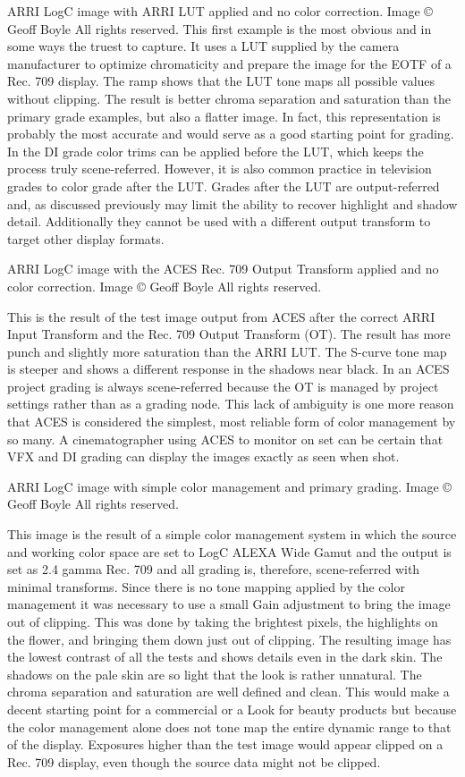 ARRI LogC image with ARRI LUT applied and no color correction.  Image © Geoff Boyle All rights reserved.
This first example is the most obvious and in some ways the truest to capture. It uses a LUT supplied by the camera manufacturer to optimize chromaticity and prepare the image for the EOTF of a Rec. 709 display. The ramp shows that the LUT tone maps all possible values without clipping. The result is better chroma separation and saturation than the primary grade examples, but also a flatter image. In fact, this representation is probably the most accurate and would serve as a good starting point for grading. In the DI grade color trims can be applied before the LUT, which keeps the process truly scene-referred. However, it is also common practice in television grades to color grade after the LUT. Grades after the LUT are output-referred and, as discussed previously may limit the ability to recover highlight and shadow detail. Additionally they cannot be used with a different output transform to target other display formats. 


ARRI LogC image with the ACES Rec. 709 Output Transform applied and no color correction.  Image © Geoff Boyle All rights reserved.


This is the result of the test image output from ACES after the correct ARRI Input Transform and the Rec. 709 Output Transform (OT). The result has more punch and slightly more saturation than the ARRI LUT. The S-curve tone map is steeper and shows a different response in the shadows near black. In an ACES project grading is always scene-referred because the OT is managed by project settings rather than as a grading node. This lack of ambiguity is one more reason that ACES is considered the simplest, most reliable form of color management by so many. A cinematographer using ACES to monitor on set can be certain that VFX and DI grading can display the images exactly as seen when shot.


ARRI LogC image with simple color management and primary grading.  Image © Geoff Boyle All rights reserved.

This image is the result of a simple color management system in which the source and working color space are set to LogC ALEXA Wide Gamut and the output is set as 2.4 gamma Rec. 709 and all grading is, therefore, scene-referred with minimal transforms. Since there is no tone mapping applied by the color management it was necessary to use a small Gain adjustment to bring the image out of clipping. This was done by taking the brightest pixels, the highlights on the flower, and bringing them down just out of clipping. The resulting image has the lowest contrast of all the tests and shows details even in the dark skin. The shadows on the pale skin are so light that the look is rather unnatural. The chroma separation and saturation are well defined and clean. This would make a decent starting point for a commercial or a Look for beauty products but because the color management alone does not tone map the entire dynamic range to that of the display. Exposures higher than the test image would appear clipped on a Rec. 709 display, even though the source data might not be clipped.

